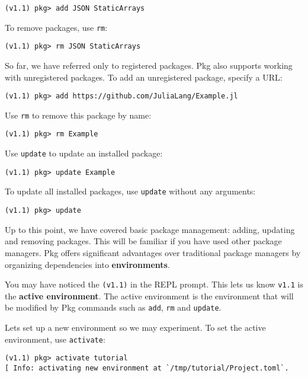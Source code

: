 \begin{verbatim}
(v1.1) pkg> add JSON StaticArrays
\end{verbatim}

To remove packages, use \texttt{rm}:


\begin{verbatim}
(v1.1) pkg> rm JSON StaticArrays
\end{verbatim}

So far, we have referred only to registered packages. Pkg also supports working with unregistered packages. To add an unregistered package, specify a URL:


\begin{verbatim}
(v1.1) pkg> add https://github.com/JuliaLang/Example.jl
\end{verbatim}

Use \texttt{rm} to remove this package by name:


\begin{verbatim}
(v1.1) pkg> rm Example
\end{verbatim}

Use \texttt{update} to update an installed package:


\begin{verbatim}
(v1.1) pkg> update Example
\end{verbatim}

To update all installed packages, use \texttt{update} without any arguments:


\begin{verbatim}
(v1.1) pkg> update
\end{verbatim}

Up to this point, we have covered basic package management: adding, updating and removing packages. This will be familiar if you have used other package managers. Pkg offers significant advantages over traditional package managers by organizing dependencies into \textbf{environments}.

You may have noticed the \texttt{(v1.1)} in the REPL prompt. This lets us know \texttt{v1.1} is the \textbf{active environment}. The active environment is the environment that will be modified by Pkg commands such as \texttt{add}, \texttt{rm} and \texttt{update}.

Let{\textquotesingle}s set up a new environment so we may experiment. To set the active environment, use \texttt{activate}:


\begin{verbatim}
(v1.1) pkg> activate tutorial
[ Info: activating new environment at `/tmp/tutorial/Project.toml`.
\end{verbatim}

